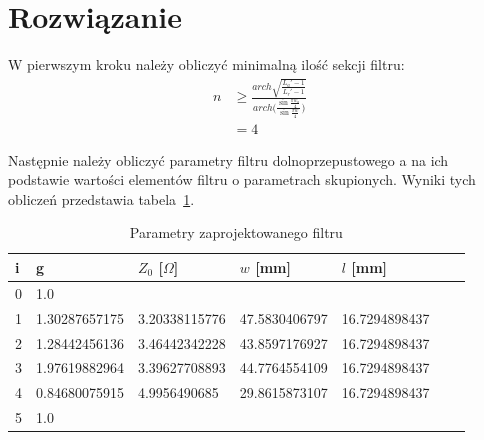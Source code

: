 \documentclass[rep.tex]{subfiles}
\begin{document}
\section{Rozwiązanie}
W pierwszym kroku należy obliczyć minimalną ilość sekcji filtru:
\begin{align}
  n &\geq \frac{arch \sqrt{\frac{L_a' - 1}{L_r' - 1}}}{arch \Bigg(\frac{\sin\frac{\pi w_a}{4}}{\sin\frac{\pi w}{4}}\Bigg)} \\
  &= 4 \nonumber
\end{align}

Następnie należy obliczyć parametry filtru dolnoprzepustowego a na ich podstawie wartości elementów filtru o parametrach skupionych.
Wyniki tych obliczeń przedstawia tabela~\ref{tab:zad17:params}.

\begin{table}
  \centering
  \caption{Parametry zaprojektowanego filtru}
  \label{tab:zad17:params}
  \begin{tabular}{l l l l l l l}
    \hline\hline
    i & g & $Z_0$ [$\Omega$] & $w$ [mm] & $l$ [mm]\\
    \hline
    0 & 1.0           &               &               &               \\
    1 & 1.30287657175 & 3.20338115776 & 47.5830406797 & 16.7294898437 \\
    2 & 1.28442456136 & 3.46442342228 & 43.8597176927 & 16.7294898437 \\
    3 & 1.97619882964 & 3.39627708893 & 44.7764554109 & 16.7294898437 \\
    4 & 0.84680075915 & 4.9956490685  & 29.8615873107 & 16.7294898437 \\
    5 & 1.0           &               &               &               \\
    \hline\hline
  \end{tabular}
\end{table}
\end{document}
